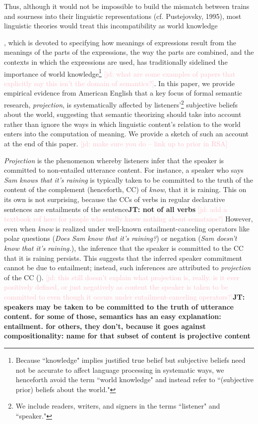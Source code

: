 \documentclass[11pt,fleqn]{article}
\newcommand{\jd}[1]{\textcolor{Pink}{[jd: #1]}}
\newcommand{\jt}[1]{\textbf{\color{blue}JT: #1}}
\newcommand{\6}{\mbox{$[\hspace*{-.6mm}[$}}
\newcommand{\9}{\mbox{$]\hspace*{-.6mm}]$}}
\begin{document}
Thus, although it would not be impossible to
build the mismatch between trains and sourness into their linguistic
representations (cf. Pustejovsky, 1995), most linguistic theories would treat
this incompatibility as world knowledge

, which is devoted to specifying how meanings of expressions result from the meanings of the parts of the expressions, the way the parts are combined, and the contexts in which the expressions are used, has traditionally sidelined the importance of world knowledge\footnote{Because ``knowledge" implies justified true belief but subjective beliefs need not be accurate to affect language processing in systematic ways, we henceforth avoid the term ``world knowledge" and instead refer to ``(subjective prior) beliefs about the world."} \jd{what are some examples of papers that explicitly say this isn't the domain of semantics?}.  In this paper, we provide empirical evidence from American English that a key focus of formal semantic research, \emph{projection}, is systematically affected by listeners'\footnote{We include readers, writers, and signers in the terms ``listener" and ``speaker."} subjective beliefs about the world, suggesting that semantic theorizing should take into account rather than ignore the ways in which linguistic content's relation to the world enters into the computation of meaning. We provide a sketch of such an account at the end of this paper. \jd{make sure you do -- link up to prior in RSA} 

\emph{Projection} is the phenomenon whereby listeners infer that the speaker is committed to non-entailed utterance content. For instance, a speaker who says \emph{Sam knows that it's raining} is typically taken to be committed to the truth of the content of the complement  (henceforth, CC) of {\em know}, that it is raining. This on its own is not surprising, because the CCs of verbs in regular declarative sentences are entailments of the sentence\jt{not of all verbs} \jd{add a textbook ref here for people who really know nothing about sematnics?} However, even when \emph{know} is realized under well-known entailment-canceling operators like polar questions (\emph{Does Sam know that it's raining?}) or negation (\emph{Sam doesn't know that it's raining.}), the inference that the speaker is committed to the CC that it is raining persists. This suggests that the inferred speaker commitment cannot be due to entailment;  instead, such inferences are attributed to  \emph{projection} of the CC  (). \jd{this still doesn't explain what projection is, really. is it ever positively defined, or just negatively as content the speaker is taken to be committed to even though it occurs under entailment-canceling operators?}\jt{speakers may be taken to be committed to the truth of utterance content. for some of those, semantics has an easy explanation: entailment. for others, they don't, because it goes against compositionality: name for that subset of content is projective content}
\end{document}
